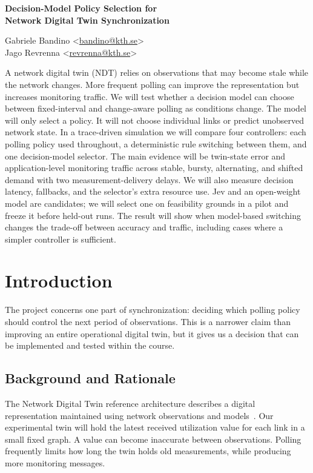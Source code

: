 \documentclass[11pt,a4paper]{article}
\newcommand{\unnumberedheading}[1]{\par\vspace{2pt}{\fontsize{14}{16.5}\selectfont\bfseries #1\par}\vspace{6pt}}
\newcommand{\reporttitle}[1]{{\fontsize{16}{19}\selectfont\bfseries #1\par}\vspace{12pt}}
\begin{document}
\reporttitle{Decision-Model Policy Selection for\\Network Digital Twin Synchronization}
\unnumberedheading{Authors}
Gabriele Bandino \textless\href{mailto:bandino@kth.se}{bandino@kth.se}\textgreater\\
Jago Revrenna \textless\href{mailto:revrenna@kth.se}{revrenna@kth.se}\textgreater

\unnumberedheading{Abstract}
A network digital twin (NDT) relies on observations that may become stale while the network changes. More frequent polling can improve the representation but increases monitoring traffic. We will test whether a decision model can choose between fixed-interval and change-aware polling as conditions change. The model will only select a policy. It will not choose individual links or predict unobserved network state. In a trace-driven simulation we will compare four controllers: each polling policy used throughout, a deterministic rule switching between them, and one decision-model selector. The main evidence will be twin-state error and application-level monitoring traffic across stable, bursty, alternating, and shifted demand with two measurement-delivery delays. We will also measure decision latency, fallbacks, and the selector's extra resource use. Jev and an open-weight model are candidates; we will select one on feasibility grounds in a pilot and freeze it before held-out runs. The result will show when model-based switching changes the trade-off between accuracy and traffic, including cases where a simpler controller is sufficient.

\section{Introduction}
The project concerns one part of synchronization: deciding which polling policy should control the next period of observations. This is a narrower claim than improving an entire operational digital twin, but it gives us a decision that can be implemented and tested within the course.

\subsection{Background and Rationale}
The Network Digital Twin reference architecture describes a digital representation maintained using network observations and models~\cite{architecture}. Our experimental twin will hold the latest received utilization value for each link in a small fixed graph. A value can become inaccurate between observations. Polling frequently limits how long the twin holds old measurements, while producing more monitoring messages.
\end{document}
